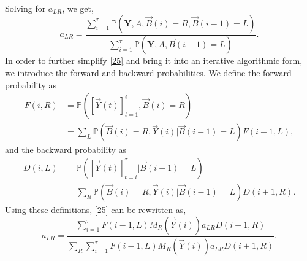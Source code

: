 \documentclass[10pt,twocolumn]{IEEEtran}
\begin{document}
Solving for $a_{LR}$, we get,
\begin{equation}\label{25}
    a_{LR} = \frac{\sum_{i=1}^{\tau}\mathbb{P}(\textbf{Y},A,\vec{B}(i)=R,\vec{B}(i-1)=L)}{\sum_{i=1}^{\tau}\mathbb{P}(\textbf{Y},A,\vec{B}(i-1)=L)}.
\end{equation}
In order to further simplify \eqref{25} and bring it into an iterative algorithmic form, we introduce the forward and backward probabilities. We define the forward probability as
\begin{equation}\label{26}
    \begin{aligned}
        F(i,R) &= \mathbb{P}([\vec{Y}(t)]_{t=1}^{i},\vec{B}(i)=R)\\
        &= 
        \sum_{L}\mathbb{P}(\vec{B}(i)=R,\vec{Y}(i)|\vec{B}(i-1)=L)F(i-1,L),
    \end{aligned}
\end{equation}
and the backward probability as
\begin{equation}\label{27}
    \begin{aligned}
        D(i,L) &= \mathbb{P}([\vec{Y}(t)]_{t=i}^{\tau}|\vec{B}(i-1)=L)\\
        &= \sum_{R}\mathbb{P}(\vec{B}(i)=R,\vec{Y}(i)|\vec{B}(i-1)=L)D(i+1,R).
    \end{aligned}
\end{equation}
Using these definitions, \eqref{25} can be rewritten as,
\begin{equation}\label{28}
    a_{LR} = \frac{\sum_{i=1}^{\tau}F(i-1,L)M_R(\vec{Y}(i))a_{LR}D(i+1,R)}{\sum_R\sum_{i=1}^{\tau}F(i-1,L)M_R(\vec{Y}(i))a_{LR}D(i+1,R)}.
\end{equation}
\end{document}
